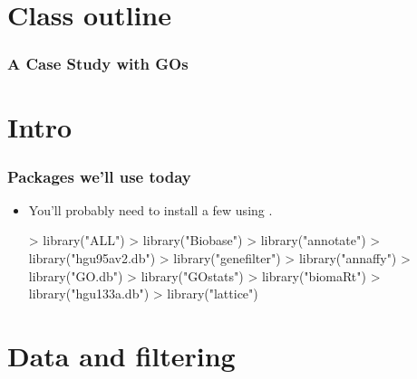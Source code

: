 




\usepackage{Sweave}


\begin{frame}[allowframebreaks]
  \titlepage
\end{frame}

\section*{Class outline}

\begin{frame}[allowframebreaks]
  \frametitle{A Case Study with GOs}
  \tableofcontents[hideallsubsections]
\end{frame}

\section{Intro}

\begin{frame}
  \frametitle{Packages we'll use today}
  \begin{itemize}
  \item You'll probably need to install a few using .
\begin{Schunk}
\begin{Sinput}
> library("ALL")
> library("Biobase")
> library("annotate")
> library("hgu95av2.db")
> library("genefilter")
> library("annaffy")
> library("GO.db")
> library("GOstats")
> library("biomaRt")
> library("hgu133a.db")
> library("lattice")
\end{Sinput}
\end{Schunk}
  \end{itemize}
\end{frame}

\section{Data and filtering}

